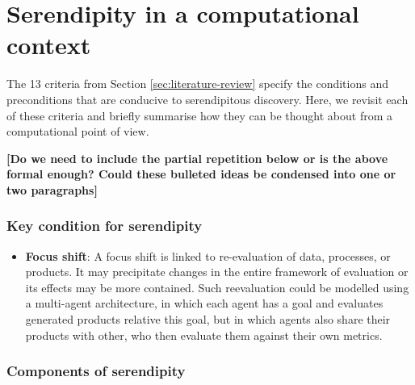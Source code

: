 \section{Serendipity in a computational context} \label{sec:computational-serendipity}

The 13 criteria from Section \ref{sec:literature-review}
specify the conditions and preconditions that are conducive to
serendipitous discovery.  Here, we revisit each of these criteria and
briefly summarise how they can be thought about from a computational
point of view.

\textbf{[Do we need to include the partial repetition below or is the
    above formal enough?  Could these bulleted ideas be condensed into
    one or two paragraphs]}

\subsubsection*{Key condition for serendipity}

\begin{itemize}
\item \textbf{Focus shift}: A focus shift is linked to re-evaluation
  of data, processes, or products.  It may precipitate changes in the
  entire framework of evaluation or its effects may be more contained.
  Such reevaluation could be modelled using a multi-agent
  architecture, in which each agent has a goal and evaluates generated
  products relative this goal, but in which agents also share their
  products with other, who then evaluate them against their own
  metrics.
\end{itemize}

\subsubsection*{Components of serendipity}

